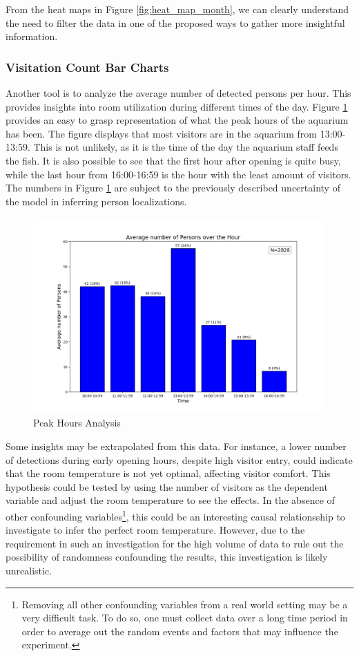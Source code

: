 From the heat maps in Figure \ref{fig:heat_map_month}, we can clearly understand the need to filter the data in one of the proposed ways to gather more insightful information. 

\subsubsection{Visitation Count Bar Charts}
\label{sec:peak_hours}
Another tool is to analyze the average number of detected persons per hour. This provides insights into room utilization during different times of the day. Figure \ref{fig:peak_hours} provides an easy to grasp representation of what the peak hours of the aquarium has been. The figure displays that most visitors are in the aquarium from 13:00-13:59. This is not unlikely, as it is the time of the day the aquarium staff feeds the fish. It is also possible to see that the first hour after opening is quite busy, while the last hour from 16:00-16:59 is the hour with the least amount of visitors. The numbers in Figure \ref{fig:peak_hours} are subject to the previously described uncertainty of the model in inferring person localizations.

\begin{figure}[H]
	\centering
	\includegraphics[width=1\textwidth]{Images/Analytics/peak_hours.png}
	\caption{Peak Hours Analysis}
    \label{fig:peak_hours}
\end{figure}

Some insights may be extrapolated from this data. For instance, a lower number of detections during early opening hours, despite high visitor entry, could indicate that the room temperature is not yet optimal, affecting visitor comfort. This hypothesis could be tested by using the number of visitors as the dependent variable and adjust the room temperature to see the effects. In the absence of other confounding variables\footnote{Removing all other confounding variables from a real world setting may be a very difficult task. To do so, one must collect data over a long time period in order to average out the random events and factors that may influence the experiment.}, this could be an interesting causal relationsship to investigate to infer the perfect room temperature. However, due to the requirement in such an investigation for the high volume of data to rule out the possibility of randomness confounding the results, this investigation is likely unrealistic.

